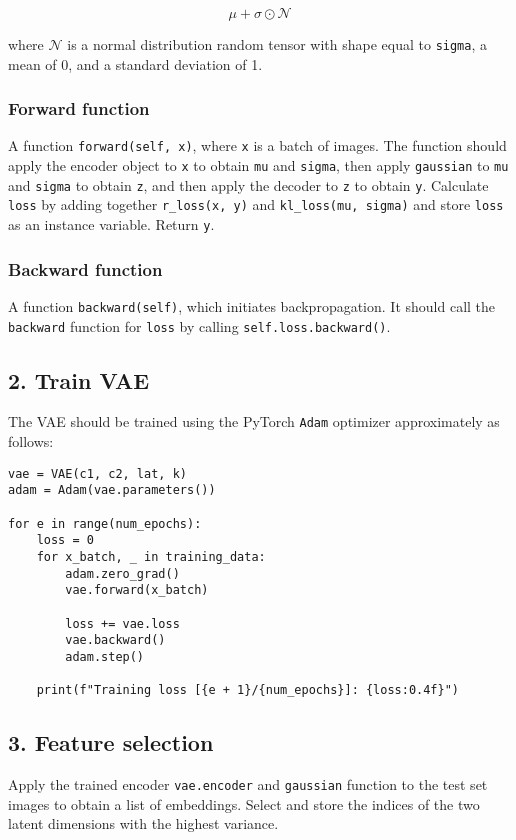 \documentclass{article}
\begin{document}
\[\mu + \sigma \odot \mathcal{N}\]

\noindent
where $\mathcal{N}$ is a normal distribution random tensor with shape equal to \texttt{sigma}, a mean of 0, and a standard deviation of 1.

\subsubsection*{Forward function}
A function \texttt{forward(self, x)}, where \texttt{x} is a batch of images. The function should apply the encoder object to \texttt{x} to obtain \texttt{mu} and \texttt{sigma}, then apply \texttt{gaussian} to \texttt{mu} and \texttt{sigma} to obtain \texttt{z}, and then apply the decoder to \texttt{z} to obtain \texttt{y}. Calculate \texttt{loss} by adding together \texttt{r\_loss(x, y)} and \texttt{kl\_loss(mu, sigma)} and store \texttt{loss} as an instance variable. Return \texttt{y}.

\subsubsection*{Backward function}
A function \texttt{backward(self)}, which initiates backpropagation. It should call the \texttt{backward} function for \texttt{loss} by calling \texttt{self.loss.backward()}.

\subsection*{2. Train VAE}
The VAE should be trained using the PyTorch \texttt{Adam} optimizer approximately as follows:

\begin{verbatim}
vae = VAE(c1, c2, lat, k)
adam = Adam(vae.parameters())

for e in range(num_epochs):
    loss = 0
    for x_batch, _ in training_data:
        adam.zero_grad()
        vae.forward(x_batch)

        loss += vae.loss
        vae.backward()
        adam.step()

    print(f"Training loss [{e + 1}/{num_epochs}]: {loss:0.4f}")
\end{verbatim}

\subsection*{3. Feature selection}
Apply the trained encoder \texttt{vae.encoder} and \texttt{gaussian} function to the test set images to obtain a list of embeddings. Select and store the indices of the two latent dimensions with the highest variance.
\end{document}
